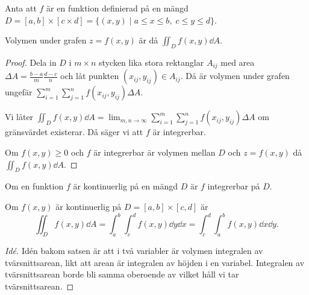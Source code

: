 \documentclass[a4paper]{article}
\begin{document}
\providecommand\fname{}
\renewcommand\fname{19-09-24}

\begin{sats}
    Anta att \(
        f
    \) är en funktion definierad på en mängd \(
        D = [a,b] \times [c\times d] = \{ (x,y) \; | \; a \leq x \leq b, \; c \leq y \leq d \}
    \).

    Volymen under grafen \(
        z = f(x,y)
    \) är då \(
        \iint_D f(x,y) \dd A
    \).

    \begin{proof}
        Dela in \(
            D
        \) i \(
            m \times n
        \) stycken lika stora rektanglar \(
            A_{ij}
        \) med area \(
            \Delta A = \frac{b-a}{m} \frac{d-c}{n}
        \) och låt punkten \(
            (x_{ij}, y_{ij}) \in A_{ij}
        \). Då är volymen under grafen ungefär \(
            \sum_{i=1}^m \sum_{j=1}^n f(x_{ij}, y_{ij}) \Delta A
        \).

        \begin{defn}[Integrerbarhet]
            Vi låter \(
                \iint_D f(x,y) \dd A = \lim_{m,n \to \infty} \sum_{i=1}^m \sum_{j=1}^n f(x_{ij}, y_{ij}) \Delta A
            \) om gränsvärdet existerar. Då säger vi att \(
                f
            \) är integrerbar.
        \end{defn}

        Om \(
            f(x,y) \geq 0
        \) och \(
            f
        \) är integrerbar är volymen mellan \(
            D
        \) och \(
            z = f(x,y)
        \) då \(
            \iint_D f(x,y) \dd A
        \).
    \end{proof}
\end{sats}

\begin{sats}
    Om en funktion \(
        f
    \) är kontinuerlig på en mängd \(
        D
    \) är \(
        f
    \) integrerbar på \(
        D
    \).
\end{sats}

\begin{sats}
    Om \(
        f(x,y)
    \) är kontinuerlig på \(
        D = [a,b] \times [c, d]
    \) är \[
        \iint_D f(x,y) \dd A = \int_a^b \int_c^d f(x,y) \dd y \dd x 
            = \int_c^d \int_a^b f(x,y) \dd x \dd y.
    \]

    \begin{proof}[Idé]
        Idén bakom satsen är att i två variabler är volymen integralen
        av tvärsnittsarean, likt att arean är integralen av höjden 
        i en variabel. Integralen av tvärsnittsarean borde bli
        samma oberoende av vilket håll vi tar tvärsnittsarean.
    \end{proof}
\end{sats}
\end{document}
